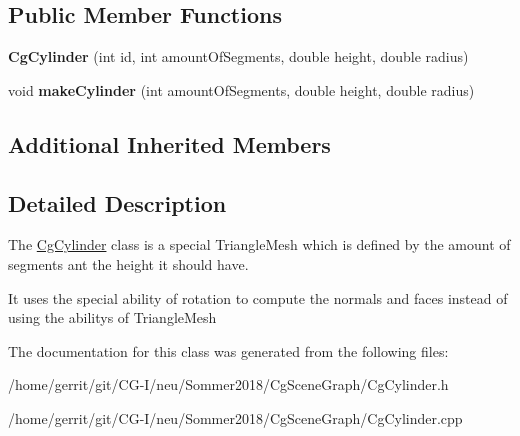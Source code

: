 \subsection*{Public Member Functions}
\begin{DoxyCompactItemize}
\item 
\mbox{\label{class_cg_cylinder_a212e1251d6d5b007ee165bac93495a77}} 
{\bfseries Cg\+Cylinder} (int id, int amount\+Of\+Segments, double height, double radius)
\item 
\mbox{\label{class_cg_cylinder_a4c3d5b69335398d0af71a838a73b6153}} 
void {\bfseries make\+Cylinder} (int amount\+Of\+Segments, double height, double radius)
\end{DoxyCompactItemize}
\subsection*{Additional Inherited Members}


\subsection{Detailed Description}
The \hyperlink{class_cg_cylinder}{Cg\+Cylinder} class is a special Triangle\+Mesh which is defined by the amount of segments ant the height it should have. 

It uses the special ability of rotation to compute the normals and faces instead of using the abilitys of Triangle\+Mesh 

The documentation for this class was generated from the following files\+:\begin{DoxyCompactItemize}
\item 
/home/gerrit/git/\+C\+G-\/\+I/neu/\+Sommer2018/\+Cg\+Scene\+Graph/Cg\+Cylinder.\+h\item 
/home/gerrit/git/\+C\+G-\/\+I/neu/\+Sommer2018/\+Cg\+Scene\+Graph/Cg\+Cylinder.\+cpp\end{DoxyCompactItemize}
